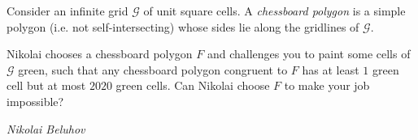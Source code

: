 Consider an infinite grid $\mathcal G$ of unit square cells. A \textit{chessboard polygon} is a simple polygon (i.e. not self-intersecting) whose sides lie along the gridlines of $\mathcal G$.

Nikolai chooses a chessboard polygon $F$ and challenges you to paint some cells of $\mathcal G$ green, such that any chessboard polygon congruent to $F$ has at least $1$ green cell but at most $2020$ green cells. Can Nikolai choose $F$ to make your job impossible?

\textit{Nikolai Beluhov}